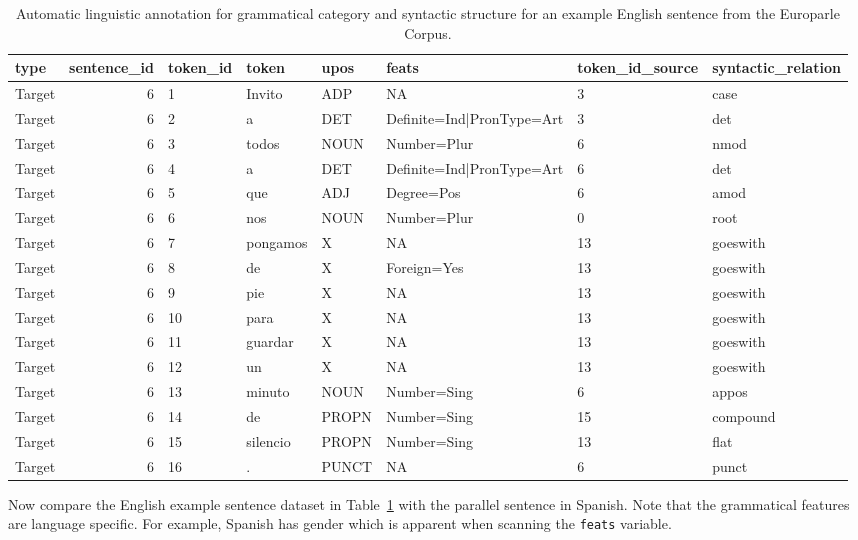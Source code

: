 \documentclass[
  letterpaper,
]{latex/krantz}
\begin{document}
\hypertarget{tbl-generation-europarle-en-example}{}
\begin{table}
\caption{\label{tbl-generation-europarle-en-example}Automatic linguistic annotation for grammatical category and syntactic
structure for an example English sentence from the Europarle Corpus. }\tabularnewline

\centering
\begin{tabular}{lrllllll}
\toprule
type & sentence\_id & token\_id & token & upos & feats & token\_id\_source & syntactic\_relation\\
\midrule
Target & 6 & 1 & Invito & ADP & NA & 3 & case\\
Target & 6 & 2 & a & DET & Definite=Ind|PronType=Art & 3 & det\\
Target & 6 & 3 & todos & NOUN & Number=Plur & 6 & nmod\\
Target & 6 & 4 & a & DET & Definite=Ind|PronType=Art & 6 & det\\
Target & 6 & 5 & que & ADJ & Degree=Pos & 6 & amod\\
\addlinespace
Target & 6 & 6 & nos & NOUN & Number=Plur & 0 & root\\
Target & 6 & 7 & pongamos & X & NA & 13 & goeswith\\
Target & 6 & 8 & de & X & Foreign=Yes & 13 & goeswith\\
Target & 6 & 9 & pie & X & NA & 13 & goeswith\\
Target & 6 & 10 & para & X & NA & 13 & goeswith\\
\addlinespace
Target & 6 & 11 & guardar & X & NA & 13 & goeswith\\
Target & 6 & 12 & un & X & NA & 13 & goeswith\\
Target & 6 & 13 & minuto & NOUN & Number=Sing & 6 & appos\\
Target & 6 & 14 & de & PROPN & Number=Sing & 15 & compound\\
Target & 6 & 15 & silencio & PROPN & Number=Sing & 13 & flat\\
\addlinespace
Target & 6 & 16 & . & PUNCT & NA & 6 & punct\\
\bottomrule
\end{tabular}
\end{table}

Now compare the English example sentence dataset in
Table~\ref{tbl-generation-europarle-en-example} with the parallel
sentence in Spanish. Note that the grammatical features are language
specific. For example, Spanish has gender which is apparent when
scanning the \texttt{feats} variable.
\end{document}
